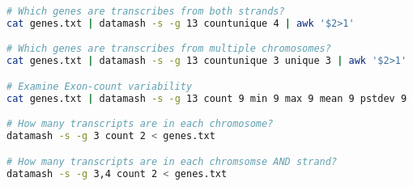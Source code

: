\begin{enumerate}
\begin{enumerate}
\begin{lstlisting}[language=bash]
# Which genes are transcribes from both strands? 
cat genes.txt | datamash -s -g 13 countunique 4 | awk '$2>1'

# Which genes are transcribes from multiple chromosomes? 
cat genes.txt | datamash -s -g 13 countunique 3 unique 3 | awk '$2>1'

# Examine Exon-count variability
cat genes.txt | datamash -s -g 13 count 9 min 9 max 9 mean 9 pstdev 9 | awk '$2>1'

# How many transcripts are in each chromosome?
datamash -s -g 3 count 2 < genes.txt

# How many transcripts are in each chromsomse AND strand?
datamash -s -g 3,4 count 2 < genes.txt
\end{lstlisting}
    \end{enumerate}
\end{enumerate}

